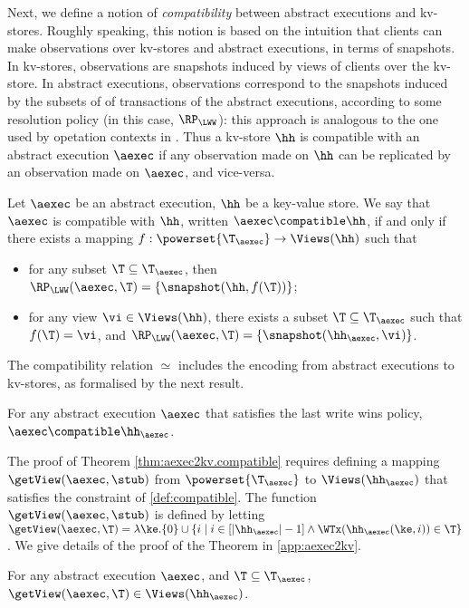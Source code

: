 Next, we define a notion of \emph{compatibility} between abstract executions and 
kv-stores. Roughly speaking, 
this notion is based on the intuition that clients can make observations over kv-stores and abstract 
executions, in terms of snapshots. In kv-stores, 
observations are snapshots induced by views of clients over the kv-store. 
In abstract executions, observations correspond to the snapshots induced by the subsets of
of transactions of the abstract executions, according to some resolution policy (in this 
case, $\RP_{\LWW}$): this approach is analogous to the one used by 
opetation contexts in \cite{repldatatypes}. Thus a kv-store $\hh$ is 
compatible with an abstract execution $\aexec$ if any observation 
made on $\hh$ can be replicated by an observation made on 
$\aexec$, and vice-versa. 

\begin{definition}
\label{def:compatible}
Let $\aexec$ be an abstract execution, $\hh$ be a key-value store. 
We say that $\aexec$ is compatible with $\hh$, written 
$\aexec \compatible \hh$, if and only if there exists a  mapping 
$f: \powerset{\T_{\aexec}} \rightarrow \Views(\hh)$
such that  
\begin{itemize}
\item for any subset $\T \subseteq \T_{\aexec}$, then $\RP_{\LWW}(\aexec, \T) = \{\snapshot(\hh, f(\T))\}$; 
\item for any view $\vi \in \Views(\hh)$, there exists a subset $\T \subseteq \T_{\aexec}$ 
such that $f(\T) = \vi$, and $\RP_{\LWW}(\aexec, \T) = \{\snapshot(\hh_{\aexec}, \vi)\}$.
\end{itemize}
\end{definition}

The compatibility relation $\simeq$ includes the encoding from abstract executions to kv-stores, 
as formalised by the next result.
\begin{theorem}
\label{thm:aexec2kv.compatible}
For any abstract execution $\aexec$ that satisfies the last write wins policy, $\aexec \compatible \hh_{\aexec}$.
\end{theorem}

The proof of Theorem \ref{thm:aexec2kv.compatible} requires defining a mapping 
$\getView(\aexec, \stub)$ from $\powerset{\T_{\aexec}}$ to $\Views(\hh_{\aexec})$ 
that satisfies the constraint of \cref{def:compatible}.
The function $\getView(\aexec, \stub)$ is defined by letting 
$\getView(\aexec, \T) = \lambda \ke. \{0\} \cup \{ i \mid i \in [\lvert \hh_{\aexec} \rvert - 1] \wedge 
\WTx(\hh_{\aexec}(\ke, i)) \in \T\}$.
We give details of the proof of the Theorem in \cref{app:aexec2kv}.
\begin{proposition}
\label{prop:getview.valid}
For any abstract execution $\aexec$, and $\T \subseteq \T_{\aexec}$, 
$\getView(\aexec, \T) \in \Views(\hh_{\aexec})$.
\end{proposition}

